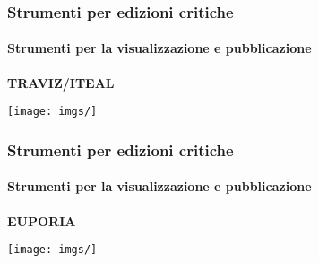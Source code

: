 \begin{frame}
    \frametitle{Strumenti per edizioni critiche}
    \framesubtitle{Strumenti per la visualizzazione e pubblicazione}
	\addtocounter{nframe}{1}
    \begin{center}
        \textbf{TRAVIZ/ITEAL}
    \end{center}
    \begin{center}
        \textit{}
	\end{center}
    \begin{center}
        \texttt{[image: imgs/]}
	\end{center}
\end{frame}

\begin{frame}
    \frametitle{Strumenti per edizioni critiche}
    \framesubtitle{Strumenti per la visualizzazione e pubblicazione}
	\addtocounter{nframe}{1}
    \begin{center}
        \textbf{EUPORIA}
    \end{center}
    \begin{center}
        \textit{}
	\end{center}
    \begin{center}
        \texttt{[image: imgs/]}
	\end{center}
\end{frame}
